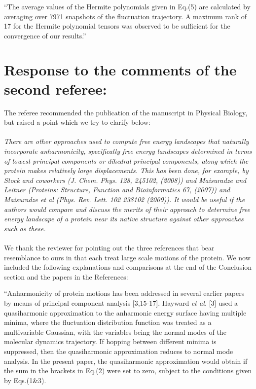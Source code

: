 \documentclass[12pt,article]{iopart}
\begin{document}
``The average values of the Hermite polynomials given in Eq.(5) are
calculated by averaging over 7971 snapshots of the fluctuation
trajectory. A maximum rank of 17 for the Hermite polynomial tensors
was observed to be sufficient for the convergence of our results.''

\section{Response to the comments of the second referee:}

The referee recommended the publication of the manuscript in Physical
Biology, but raised a point which we try to clarify below: \\ \\
{\it There are other approaches used to compute free energy landscapes
that naturally incorporate anharmonicity, specifically free energy
landscapes determined in terms of lowest principal components or
dihedral principal components, along which the protein makes
relatively large displacements. This has been done, for example, by
Stock and coworkers (J. Chem. Phys. 128, 245102, (2008)) and
Maisuradze and Leitner (Proteins: Structure, Function and
Bioinformatics 67, (2007)) and Maisuradze et al (Phys. Rev. Lett. 102
238102 (2009)). It would be useful if the authors would compare and
discuss the merits of their approach to determine free energy
landscape of a protein near its native structure against other
approaches such as these.}\\ \\
%
We thank the reviewer for pointing out the three references that bear
resemblance to ours in that each treat large scale motions of the
protein. We now included the following explanations and comparisons at
the end of the Conclusion section and the papers in the References:

``Anharmonicity of protein motions has been addressed in several
earlier papers by means of principal component analysis
[3,15-17]. Hayward {\it et al.} [3] used a quasiharmonic approximation
to the anharmonic energy surface having multiple minima, where the
fluctuation distribution function was treated as a multivariable
Gaussian, with the variables being the normal modes of the molecular
dynamics trajectory. If hopping between different minima is
suppressed, then the quasiharmonic approximation reduces to normal
mode analysis. In the present paper, the quasiharmonic approximation
would obtain if the sum in the brackets in Eq.(2) were set to zero,
subject to the conditions given by Eqs.(1\&3).
\end{document}
